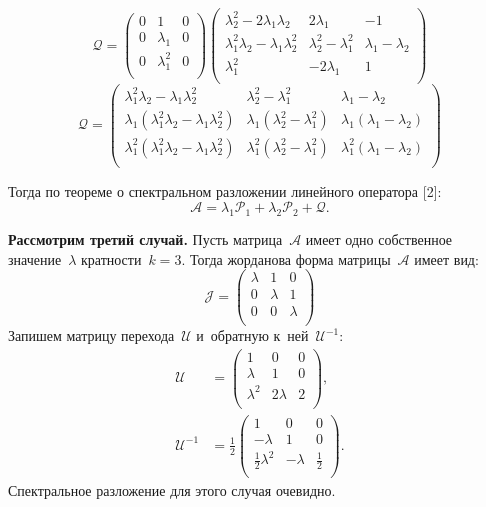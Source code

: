 $$
\mathcal{Q}=
 \begin{pmatrix}
  	0 & 1 & 0\\
  	0 & \lambda_1 & 0 \\
  	0 & \lambda_1^2 & 0 \\
\end{pmatrix}
\begin{pmatrix}
  	\lambda_2^2-2\lambda_1\lambda_2 & 2\lambda_1 & -1  \\
  	\lambda_1^2\lambda_2 - \lambda_1\lambda_2^2 & \lambda_2^2 - \lambda_1^2 & \lambda_1 - \lambda_2  \\
  	\lambda_1^2 & -2\lambda_1 & 1  \\
 \end{pmatrix}
$$
$$
\mathcal{Q}=
\begin{pmatrix}
  	\lambda_1^2\lambda_2 - \lambda_1\lambda_2^2 & \lambda_2^2 - \lambda_1^2 & \lambda_1 - \lambda_2  \\
  	\lambda_1(\lambda_1^2\lambda_2 - \lambda_1\lambda_2^2) & \lambda_1(\lambda_2^2 - \lambda_1^2) & \lambda_1(\lambda_1 - \lambda_2)  \\
  	\lambda_1^2(\lambda_1^2\lambda_2 - \lambda_1\lambda_2^2) & \lambda_1^2(\lambda_2^2 - \lambda_1^2) & \lambda_1^2(\lambda_1 - \lambda_2)  \\
 \end{pmatrix}
$$

Тогда по теореме о спектральном разложении линейного оператора [2]:
$$
	\mathcal{A} = \lambda_1\mathcal{P}_1 + \lambda_2\mathcal{P}_2 + \mathcal{Q}.
$$

\textbf{Рассмотрим третий случай.}	
Пусть матрица~$\mathcal{A}$ имеет одно собственное значение~$\lambda$ 
кратности~$k=3$. Тогда жорданова форма матрицы~$\mathcal{A}$ имеет вид:
$$
 \mathcal{J} = 
 \begin{pmatrix}
  \lambda & 1 & 0\\
  0 & \lambda & 1 \\
  0 & 0 & \lambda \\
 \end{pmatrix}
$$
Запишем матрицу перехода~$\mathcal{U}$ и~обратную к~ней~$\mathcal{U}^{-1}$:
$$
\begin{aligned}
 \mathcal{U} &= 
 \begin{pmatrix}
  	1 & 0 & 0\\
  	\lambda & 1 & 0 \\
  	\lambda^2 & 2\lambda & 2 \\
 \end{pmatrix}, \\
 \mathcal{U}^{-1} &= \frac{1}{2} 
 \begin{pmatrix}
  	1 & 0 & 0  \\
  	-\lambda & 1 & 0  \\
  	\frac{1}{2}\lambda^2 & -\lambda & \frac{1}{2} \\
 \end{pmatrix}.
\end{aligned}
$$
Спектральное разложение для этого случая очевидно.